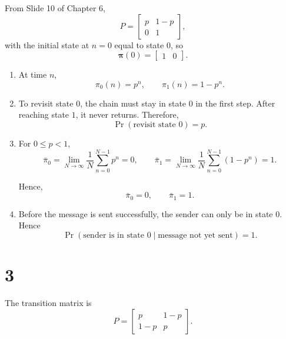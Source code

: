 \documentclass[11pt]{article}
\begin{document}
From Slide 10 of Chapter 6,
\[
P=
\begin{bmatrix}
p & 1-p\\
0 & 1
\end{bmatrix},
\]
with the initial state at \(n=0\) equal to state \(0\), so
\[
\bm{\pi}(0)=
\begin{bmatrix}
1 & 0
\end{bmatrix}.
\]

\begin{enumerate}[label=\alph*)]
\item At time \(n\),
\[
\pi_0(n)=p^n,
\qquad
\pi_1(n)=1-p^n.
\]

\item To revisit state \(0\), the chain must stay in state \(0\) in the first step. After reaching
state \(1\), it never returns. Therefore,
\[
\boxed{\Pr(\text{revisit state }0)=p.}
\]

\item For \(0 \le p < 1\),
\[
\bar{\pi}_0=\lim_{N\to\infty}\frac{1}{N}\sum_{n=0}^{N-1}p^n=0,
\qquad
\bar{\pi}_1=\lim_{N\to\infty}\frac{1}{N}\sum_{n=0}^{N-1}(1-p^n)=1.
\]

Hence,
\[
\boxed{\bar{\pi}_0=0,\qquad \bar{\pi}_1=1.}
\]

\item Before the message is sent successfully, the sender can only be in state \(0\). Hence
\[
\boxed{\Pr(\text{sender is in state }0\mid \text{message not yet sent})=1.}
\]
\end{enumerate}

\section*{3}

The transition matrix is
\[
P=
\begin{bmatrix}
p & 1-p\\
1-p & p
\end{bmatrix}.
\]
\end{document}
